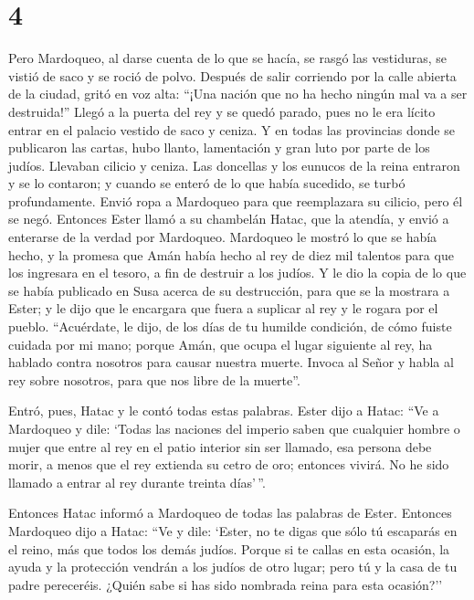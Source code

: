 \hypertarget{section-3}{%
\section{4}\label{section-3}}

 Pero Mardoqueo, al darse cuenta de lo que se hacía, se
rasgó las vestiduras, se vistió de saco y se roció de polvo. Después de
salir corriendo por la calle abierta de la ciudad, gritó en voz alta:
``¡Una nación que no ha hecho ningún mal va a ser destruida!''
 Llegó a la puerta del rey y se quedó parado, pues no le
era lícito entrar en el palacio vestido de saco y ceniza. 
Y en todas las provincias donde se publicaron las cartas, hubo llanto,
lamentación y gran luto por parte de los judíos. Llevaban cilicio y
ceniza.  Las doncellas y los eunucos de la reina entraron
y se lo contaron; y cuando se enteró de lo que había sucedido, se turbó
profundamente. Envió ropa a Mardoqueo para que reemplazara su cilicio,
pero él se negó.  Entonces Ester llamó a su chambelán
Hatac, que la atendía, y envió a enterarse de la verdad por Mardoqueo.
 Mardoqueo le mostró lo que se había hecho, y la promesa
que Amán había hecho al rey de diez mil talentos para que los ingresara
en el tesoro, a fin de destruir a los judíos.  Y le dio la
copia de lo que se había publicado en Susa acerca de su destrucción,
para que se la mostrara a Ester; y le dijo que le encargara que fuera a
suplicar al rey y le rogara por el pueblo. ``Acuérdate, le dijo, de los
días de tu humilde condición, de cómo fuiste cuidada por mi mano; porque
Amán, que ocupa el lugar siguiente al rey, ha hablado contra nosotros
para causar nuestra muerte. Invoca al Señor y habla al rey sobre
nosotros, para que nos libre de la muerte''.

 Entró, pues, Hatac y le contó todas estas palabras.
 Ester dijo a Hatac: ``Ve a Mardoqueo y dile:
 `Todas las naciones del imperio saben que cualquier
hombre o mujer que entre al rey en el patio interior sin ser llamado,
esa persona debe morir, a menos que el rey extienda su cetro de oro;
entonces vivirá. No he sido llamado a entrar al rey durante treinta
días'\,''.

 Entonces Hatac informó a Mardoqueo de todas las palabras
de Ester.  Entonces Mardoqueo dijo a Hatac: ``Ve y dile:
`Ester, no te digas que sólo tú escaparás en el reino, más que todos los
demás judíos.  Porque si te callas en esta ocasión, la
ayuda y la protección vendrán a los judíos de otro lugar; pero tú y la
casa de tu padre pereceréis. ¿Quién sabe si has sido nombrada reina para
esta ocasión?''

